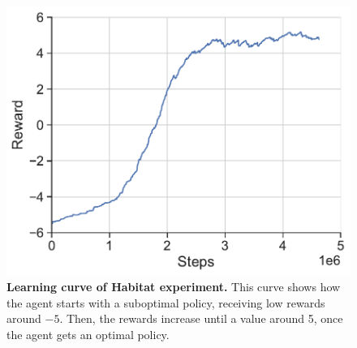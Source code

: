 \begin{figure}
    \centering
    \includegraphics[width=0.8\linewidth]{figures/understanding_vsn/habitat_reward}
    \caption{\textbf{Learning curve of Habitat experiment.} This curve shows how the agent starts with a suboptimal policy, receiving low rewards around $-5$. Then, the rewards increase until a value around 5, once the agent gets an optimal policy.}
    \label{fig:reward-habitat-results}
\end{figure}

